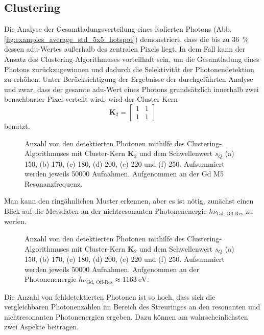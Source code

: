 \subsection{Clustering}
\noindent
Die Analyse der Gesamtladungsverteilung eines isolierten Photons (Abb. \ref{fig:examples_average_std_5x5_hotspot}) demonstriert, dass die bis zu \SI{36}{\percent} dessen \gls{adu}-Wertes außerhalb des zentralen Pixels liegt. In dem Fall kann der Ansatz des Clustering-Algorithmuses vorteilhaft sein, um die Gesamtladung eines Photons zurückzugewinnen und dadurch die Selektivität der Photonendetektion zu erhöhen. Unter Berücksichtigung der Ergebnisse der durchgeführten Analyse und zwar, dass der gesamte \gls{adu}-Wert eines Photons grundsätzlich innerhalb zwei benachbarter Pixel verteilt wird, wird der Cluster-Kern
\begin{equation}
    \mathbf{K}_2 = \begin{bmatrix}
1 & 1\\
1 & 1
\end{bmatrix}
\end{equation}
benutzt.
\begin{figure}[H]
    \centering
    
    \caption{Anzahl von den detektierten Photonen mithilfe des Clustering-Algorithmuses mit Cluster-Kern $\mathbf{K}_2$ und dem Schwellenwert $s_Q$ (a) \SI{150}{\adu}, (b) \SI{170}{\adu}, (c) \SI{180}{\adu}, (d) \SI{200}{\adu}, (e) \SI{220}{\adu} und (f) \SI{250}{\adu}. Aufsummiert werden jeweils \num{50000} Aufnahmen. Aufgenommen an der Gd M5 Resonanzfrequenz.}
    \label{fig:cl_2_150_170_180_200_220_250_resonance}
\end{figure}
\noindent
Man kann den ringähnlichen Muster erkennen, aber es ist nötig, zunächst einen Blick auf die Messdaten an der nichtresonanten Photonenenergie $h\nu_\text{Gd, Off-Res}$ zu werfen. \begin{figure}[H]
    \centering
    
    \caption{Anzahl von den detektierten Photonen mithilfe des Clustering-Algorithmuses mit Cluster-Kern $\mathbf{K}_2$ und dem Schwellenwert $s_Q$ (a) \SI{150}{\adu}, (b) \SI{170}{\adu}, (c) \SI{180}{\adu}, (d) \SI{200}{\adu}, (e) \SI{220}{\adu} und (f) \SI{250}{\adu}. Aufsummiert werden jeweils \num{50000} Aufnahmen. Aufgenommen an der Photonenenergie $h\nu_\text{Gd, Off-Res} \approx \SI{1163}{\eV}$.}
    \label{fig:cl_150_170_180_200_220_250_off_resonance}
\end{figure}
\noindent
Die Anzahl von fehldetektierten Photonen ist so hoch, dass sich die vergleichbaren Photonenzahlen im Bereich des Streuringes an den resonanten und nichtresonanten Photonenergien ergeben. Dazu können am wahrscheinlichsten zwei Aspekte beitragen. 

